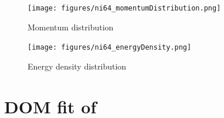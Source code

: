 \begin{figure}[H]
    \centering
    \texttt{[image: figures/ni64\_momentumDistribution.png]}
    \caption{Momentum distribution}
    \label{DOMFitData_ni64_momentumDistribution}
\end{figure}

\begin{figure}[H]
    \centering
    \texttt{[image: figures/ni64\_energyDensity.png]}
    \caption{Energy density distribution}
    \label{DOMFitData_ni64_energyDensity}
\end{figure}

\section{DOM fit of \snTwelve}

\label{sn112DOMOutput}
